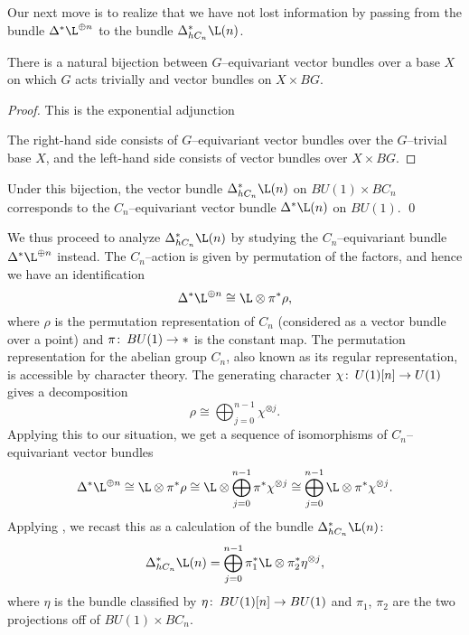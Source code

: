 Our next move is to realize that we have not lost information by passing from the bundle $\Delta^* \L^{\oplus n}$ to the bundle $\Delta_{hC_n}^* \L(n)$.
\begin{theorem}\label{GEquivBundlesVsBundlesOverBG}
There is a natural bijection between $G$--equivariant vector bundles over a base $X$ on which $G$ acts trivially and vector bundles on $X \times BG$.
\end{theorem}
\begin{proof}
This is the exponential adjunction
\begin{center}
\end{center}
The right-hand side consists of $G$--equivariant vector bundles over the $G$--trivial base $X$, and the left-hand side consists of vector bundles over $X \times BG$.
\end{proof}

\begin{corollary}
Under this bijection, the vector bundle $\Delta_{hC_n}^* \L(n)$ on $BU(1) \times BC_n$ corresponds to the $C_n$--equivariant vector bundle $\Delta^* \L(n)$ on $BU(1)$. \qed
\end{corollary}

We thus proceed to analyze $\Delta^*_{hC_n} \L(n)$ by studying the $C_n$--equivariant bundle $\Delta^* \L^{\oplus n}$ instead.  The $C_n$--action is given by permutation of the factors, and hence we have an identification \[\Delta^* \L^{\oplus n} \cong \L \otimes \pi^* \rho,\] where $\rho$ is the permutation representation of $C_n$ (considered as a vector bundle over a point) and $\pi\colon\thinspace BU(1) \to *$ is the constant map.  The permutation representation for the abelian group $C_n$, also known as its regular representation, is accessible by character theory.  The generating character $\chi\colon\thinspace U(1)[n] \to U(1)$ gives a decomposition \[\rho \cong \bigoplus_{j=0}^{n-1} \chi^{\otimes j}.\]  Applying this to our situation, we get a sequence of isomorphisms of $C_n$--equivariant vector bundles \[\Delta^* \L^{\oplus n} \cong \L \otimes \pi^* \rho \cong \L \otimes \bigoplus_{j=0}^{n-1} \pi^* \chi^{\otimes j} \cong \bigoplus_{j=0}^{n-1} \L \otimes \pi^* \chi^{\otimes j}.\]  Applying , we recast this as a calculation of the bundle $\Delta_{hC_n}^* \L(n)$: \[\Delta_{hC_n}^* \L(n) = \bigoplus_{j=0}^{n-1} \pi_1^* \L \otimes \pi_2^* \eta^{\otimes j},\] where $\eta$ is the bundle classified by $\eta\colon\thinspace BU(1)[n] \to BU(1)$ and $\pi_1$, $\pi_2$ are the two projections off of $BU(1) \times BC_n$.

